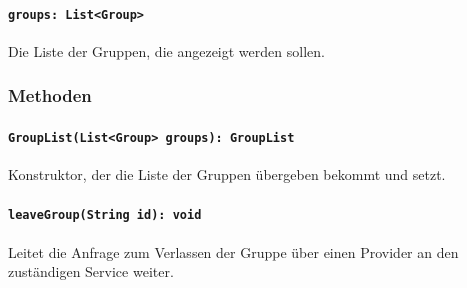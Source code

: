 \documentclass{entwurfsheft}
\begin{document}
\begin{sloppypar}
\paragraph{\texttt{groups: List<Group>}}
Die Liste der Gruppen, die angezeigt werden sollen.
\subsubsection*{Methoden}
\paragraph{\texttt{GroupList(List<Group> groups): GroupList}}
Konstruktor, der die Liste der Gruppen übergeben bekommt und setzt.
\paragraph{\texttt{leaveGroup(String id): void}}
Leitet die Anfrage zum Verlassen der Gruppe über einen Provider an den zuständigen Service weiter.
\newpage

\end{sloppypar}
\end{document}
